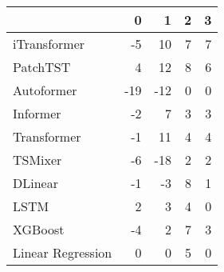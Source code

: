 \begin{tabular}{lrrrr}
\toprule
 & 0 & 1 & 2 & 3 \\
\midrule
iTransformer & -5 & 10 & 7 & 7 \\
PatchTST & 4 & 12 & 8 & 6 \\
Autoformer & -19 & -12 & 0 & 0 \\
Informer & -2 & 7 & 3 & 3 \\
Transformer & -1 & 11 & 4 & 4 \\
TSMixer & -6 & -18 & 2 & 2 \\
DLinear & -1 & -3 & 8 & 1 \\
LSTM & 2 & 3 & 4 & 0 \\
XGBoost & -4 & 2 & 7 & 3 \\
Linear Regression & 0 & 0 & 5 & 0 \\
\bottomrule
\end{tabular}
